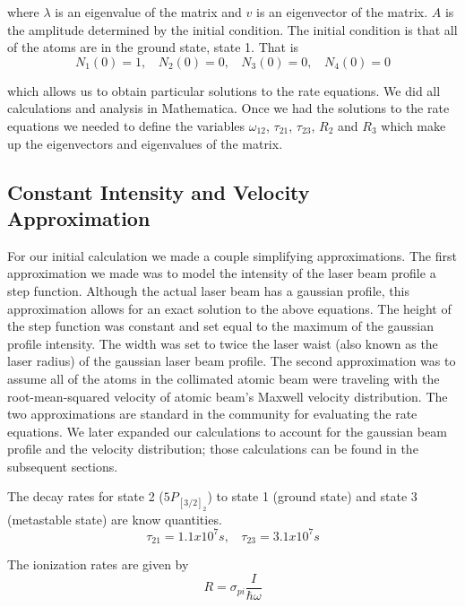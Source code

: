 \documentclass[prb,preprint]{revtex4-1}
\begin{document}
where $\lambda$ is an eigenvalue of the matrix and $v$ is an eigenvector of the matrix. $A$ is the amplitude determined by the initial condition. The initial condition is that all of the atoms are in the ground state, state 1. That is
\begin{equation}
\label{InitialCond}
N_1(0) = 1, \	\	\	\	
N_2(0) = 0, \	\	\	\	
N_3(0) = 0, \	\	\	\	
N_4(0) = 0 
\end{equation}

which allows us to obtain particular solutions to the rate equations. We did all calculations and analysis in Mathematica. Once we had the solutions to the rate equations we needed to define the variables $\omega_{12}$, $\tau_{21}$, $\tau_{23}$, $R_2$ and $R_3$ which make up the eigenvectors and eigenvalues of the matrix.

\subsection{Constant Intensity and Velocity Approximation} 

For our initial calculation we made a couple simplifying approximations. The first approximation we made was to model the intensity of the laser beam profile a step function.  Although the actual laser beam has a gaussian profile, this approximation allows for an exact solution to the above equations.  The height of the step function was constant and set equal to the maximum of the gaussian profile intensity. The width was set to twice the laser waist (also known as the laser radius) of the gaussian laser beam profile.  The second approximation was to assume all of the atoms in the collimated atomic beam were traveling with the root-mean-squared velocity of atomic beam's Maxwell velocity distribution.  The two approximations are standard in the community for evaluating the rate equations.  We later expanded our calculations to account for the gaussian beam profile and the velocity distribution; those calculations can be found in the subsequent sections. 

The decay rates for state 2 ($5P_{[3/2]_2}$) to state 1 (ground state) and state 3 (metastable state) are know quantities.~\cite{KrTransitions}
\begin{equation}
\label{DecayRates} 
\tau_{21} = 1.1x10^7 s, \	\	\	\	 \tau_{23} = 3.1x10^7s
\end{equation} 

The ionization rates are given by 
\begin{equation}
\label{IonizationRates}
R = \sigma_{pi} \frac{I}{\hbar\omega}
\end{equation}
\end{document}
